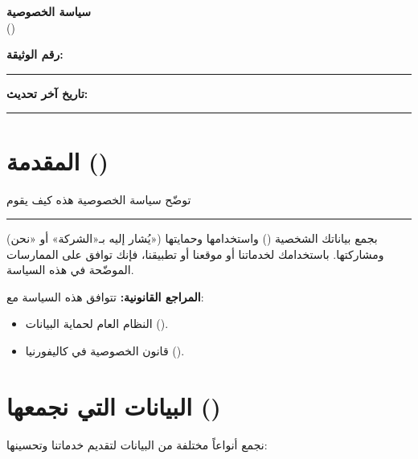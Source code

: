 \documentclass[12pt,a4paper]{article}
\begin{document}
\begin{center}
{\LARGE\bfseries سياسة الخصوصية}\\[0.5em]
{\large ()}\\[1em]
\end{center}

\vspace{0.5em}

\noindent\textbf{رقم الوثيقة:} \rule{4cm}{0.4pt} \hfill \textbf{تاريخ آخر تحديث:} \rule{4cm}{0.4pt}

\vspace{1em}

\section{المقدمة ()}
\label{sec:intro}
توضّح سياسة الخصوصية هذه كيف يقوم \rule{5cm}{0.4pt} (يُشار إليه بـ«الشركة» أو «نحن») بجمع بياناتك الشخصية () واستخدامها وحمايتها ومشاركتها. باستخدامك لخدماتنا أو موقعنا أو تطبيقنا، فإنك توافق على الممارسات الموضّحة في هذه السياسة.

\medskip
\noindent\textbf{المراجع القانونية:} تتوافق هذه السياسة مع:
\begin{itemize}
    \item النظام العام لحماية البيانات ().
    \item قانون الخصوصية في كاليفورنيا ().
\end{itemize}

\section{البيانات التي نجمعها ()}
\label{sec:data}
نجمع أنواعاً مختلفة من البيانات لتقديم خدماتنا وتحسينها:
\end{document}
